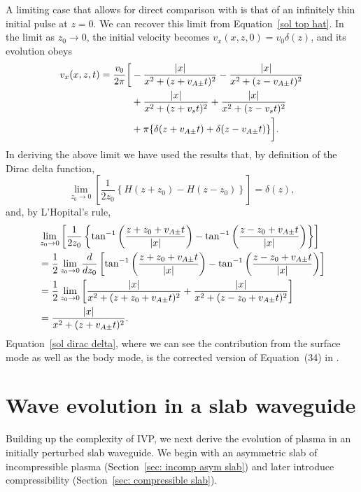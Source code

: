 A limiting case that allows for direct comparison with \cite{rae_etal81} is that of an infinitely thin initial pulse at $z = 0$. We can recover this limit from Equation~\eqref{sol top hat}. In the limit as $z_0 \to 0$, the initial velocity becomes $v_x(x, z, 0) = v_0 \delta(z)$, and its evolution obeys
\begin{align}
v_x(x, z, t) = \frac{v_0}{2\pi} \bigg[ &- \frac{|x|}{x^2 + (z + v_{A\pm}t)^2} - \frac{|x|}{x^2 + (z - v_{A\pm}t)^2} \notag \\
&+ \frac{|x|}{x^2 + (z + v_st)^2} + \frac{|x|}{x^2 + (z - v_st)^2} \notag \\
&+ \pi\{\delta(z + v_{A\pm}t) + \delta(z - v_{A\pm}t)\} \bigg]. \label{sol dirac delta}
\end{align}
In deriving the above limit we have used the results that, by definition of the Dirac delta function,
\begin{equation}
\lim_{z_0 \to 0} \left[\frac{1}{2z_0} \left\{H(z + z_0) - H(z - z_0)\right\}\right] = \delta(z),
\end{equation}
and, by L'Hopital's rule,
\begin{align}
&\lim_{z_0 \to 0} \left[\frac{1}{2z_0}\left\{\tan^{-1}\left( \frac{z + z_0 + v_{A\pm}t}{|x|} \right) - \tan^{-1}\left( \frac{z - z_0 + v_{A\pm}t}{|x|} \right)\right\}\right] \notag \\
&= \frac{1}{2} \lim_{z_0 \to 0} \frac{d}{dz_0} \left[\tan^{-1}\left( \frac{z + z_0 + v_{A\pm}t}{|x|} \right) - \tan^{-1}\left( \frac{z - z_0 + v_{A\pm}t}{|x|} \right)\right] \notag \\
&= \frac{1}{2} \lim_{z_0 \to 0} \left[ \frac{|x|}{x^2 + (z + z_0 + v_{A\pm}t)^2} + \frac{|x|}{x^2 + (z - z_0 + v_{A\pm}t)^2} \right] \notag \\
&= \frac{|x|}{x^2 + (z + v_{A\pm}t)^2}.
\end{align}
Equation~\eqref{sol dirac delta}, where we can see the contribution from the surface mode as well as the body mode, is the corrected version of Equation~(34) in \cite{rae_etal81}.


\section{Wave evolution in a slab waveguide}
\label{sec: IVP slab}


Building up the complexity of IVP, we next derive the evolution of plasma in an initially perturbed slab waveguide. We begin with an asymmetric slab of incompressible plasma (Section~\ref{sec: incomp asym slab}) and later introduce compressibility (Section~\ref{sec: compressible slab}).

